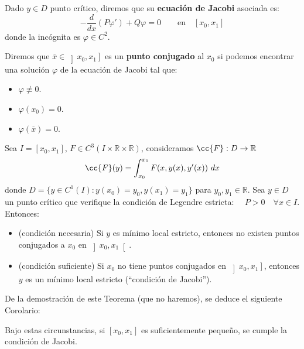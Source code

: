 \begin{definicion}
    Dado $y\in D$ punto crítico, diremos que su \textbf{ecuación de Jacobi} asociada es:
    \begin{equation*}
        -\frac{d}{dx}(P\varphi') + Q\varphi = 0 \qquad \text{en}\quad  [x_0,x_1]
    \end{equation*}
    donde la incógnita es $\varphi \in C^2$. 
\end{definicion}

\begin{definicion}
    Diremos que $\overline{x}\in \left]x_0,x_1\right]$ es un \textbf{punto conjugado} al $x_0$ si podemos encontrar una solución $\varphi$ de la ecuación de Jacobi tal que:
    \begin{itemize}
        \item $\varphi \not\equiv 0$.
        \item $\varphi(x_0) = 0$.
        \item $\varphi(\overline{x}) = 0$.
    \end{itemize}
\end{definicion}

\begin{teo}
    Sea $I=[x_0,x_1]$, $F\in C^3(I\times\mathbb{R}\times\mathbb{R})$, consideramos $\cc{F}:D\to \mathbb{R}$
    \begin{equation*}
        \cc{F}(y) = \int_{x_0}^{x_1} F(x,y(x),y'(x))~dx 
    \end{equation*}
    donde $D = \{y\in C^1(I) : y(x_0) = y_0, y(x_1) = y_1\}$ para $y_0,y_1\in \mathbb{R}$. Sea $y\in D$ un punto crítico que verifique la condición de Legendre estricta: $\quad P>0\quad \forall x\in I$. Entonces:
    \begin{itemize}
        \item (condición necesaria) Si $y$ es mínimo local estricto, entonces no existen puntos conjugados a $x_0$ en $\left]x_0,x_1\right[$.
        \item (condición suficiente) Si $x_0$ no tiene puntos conjugados en $\left]x_0,x_1\right]$, entonces $y$ es un mínimo local estricto (``condición de Jacobi'').
    \end{itemize}
\end{teo}

\noindent
De la demostración de este Teorema (que no haremos), se deduce el siguiente Corolario:

\begin{coro}
    Bajo estas circunstancias, si $[x_0,x_1]$ es suficientemente pequeño, se cumple la condición de Jacobi.
\end{coro}

